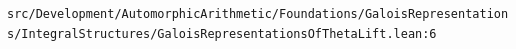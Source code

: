 \nolinkurl{src/Development/AutomorphicArithmetic/Foundations/GaloisRepresentations/IntegralStructures/GaloisRepresentationsOfThetaLift.lean:6}%
